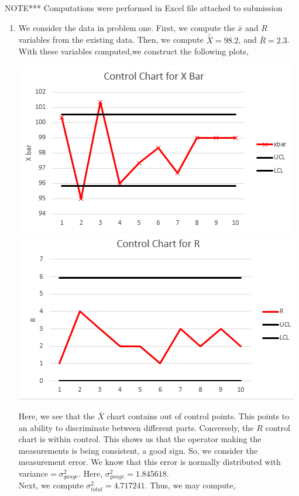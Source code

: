 \documentclass[letterpaper,10pt]{article}
\begin{document}
NOTE*** Computations were performed in Excel file attached to submission
\begin{enumerate}
\item We consider the data in problem one. First, we compute the $\bar{x}$ and $R$ variables from the existing data. Then, we compute $\bar{\bar{X}}=98.2$, and $\bar{R}=2.3$. With these variables computed,we construct the following plots,
\begin{center}
\includegraphics[scale=0.85]{xbarcontrol.png}\\
\includegraphics[scale=0.85]{rbarcontrol.png}
\end{center}
Here, we see that the $\bar{X}$ chart contains out of control points. This points to an ability to discriminate between different parts. Conversely, the $R$ control chart is within control. This shows us that the operator making the measurements is being consistent, a good sign. So, we consider the measurement error. We know that this error is normally distributed with variance$=\sigma^2_{gauge}$. Here, $\sigma^2_{gauge}=1.845618$.\\
Next, we compute $\sigma^2_{total}=4.717241$. Thus, we may compute,

\end{enumerate}
\end{document}
